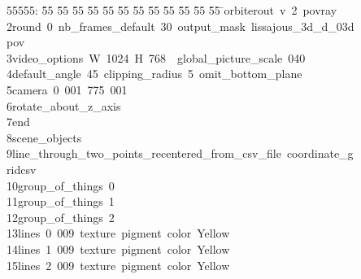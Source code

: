 %
%
\begin{tabbing}
55555: \= 55 \= 55 \= 55 \= 55 \= 55 \= 55 \= 55 \= 55 \= 55 \= 55 \= 55 \= 55 \= \>orbiterout\ v\ 2\ povray\ \\[0pt]
2\>\>round\ 0\ nb\_frames\_default\ 30\ output\_mask\ lissajous\_3d\_d\_03d\\[0pt]
\>pov\ \\[0pt]
3\>\>video\_options\ W\ 1024\ H\ 768\ \ global\_picture\_scale\ 040\ \\[0pt]
4\>\>default\_angle\ 45\ clipping\_radius\ 5\ omit\_bottom\_plane\ \ \\[0pt]
5\>\>camera\ 0\ 001\ 775\ 001\ \ \\[0pt]
6\>\>rotate\_about\_z\_axis\ \\[0pt]
7\>\>end\ \\[0pt]
8\>\>scene\_objects\ \\[0pt]
9\>\>\>line\_through\_two\_points\_recentered\_from\_csv\_file\ coordinate\_g\\[0pt]
\>ridcsv\ \\[0pt]
10\>\>\>group\_of\_things\ 0\ \\[0pt]
11\>\>\>group\_of\_things\ 1\ \\[0pt]
12\>\>\>group\_of\_things\ 2\ \\[0pt]
13\>\>\>lines\ 0\ 009\ texture\ pigment\ color\ Yellow\ \ \ \\[0pt]
14\>\>\>lines\ 1\ 009\ texture\ pigment\ color\ Yellow\ \ \ \\[0pt]
15\>\>\>lines\ 2\ 009\ texture\ pigment\ color\ Yellow\ \ \ \\[0pt]

\end{tabbing}
